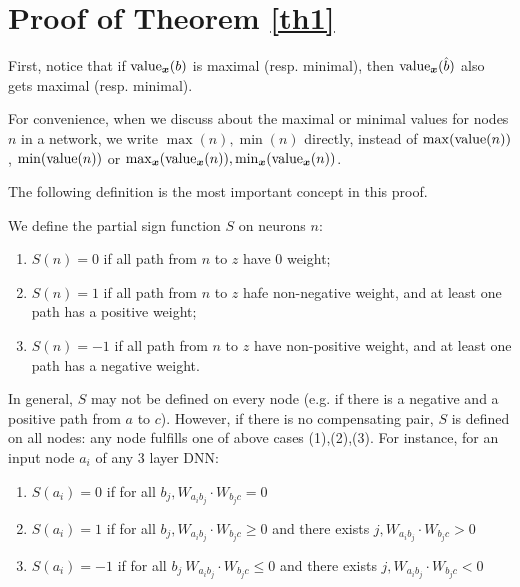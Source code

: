 	\section{Proof of Theorem \ref{th1}}	
	
	First, notice that if ${\textrm{value}}_{\boldsymbol{x}}(b)$ is maximal (resp. minimal), 
	then ${\textrm{value}}_{\boldsymbol{x}}(\hat{b})$ also gets maximal (resp. minimal). 
	
	For convenience, when we discuss about the maximal or minimal values for nodes $n$ in a network, we write $\max(n),\min(n)$ directly, instead of $\max({\textrm{value}}(n))$, $\min({\textrm{value}}(n))$ or $\max_{\boldsymbol{x}}({\textrm{value}}_{\boldsymbol{x}}(n)),\min_{\boldsymbol{x}}({\textrm{value}}_{\boldsymbol{x}}(n))$.
	
	
	The following definition is the most important concept in this proof.
	
	\begin{definition}\label{sign_of_nodes}
		We define the partial sign function $S$ on neurons $n$: 	
		\begin{enumerate}
			 \item $S(n)=0$ if all path from $n$ to $z$ have 0 weight; 
			 \item $S(n)=1$ if all path from $n$ to $z$ hafe non-negative weight, and at least one path has a positive weight; 
			 \item $S(n)=-1$ if all path from $n$ to $z$ have non-positive weight, and at least one path has a negative weight. 
		\end{enumerate}
	\end{definition}
	
	In general, $S$ may not be defined on every node (e.g. if there is a negative and a positive path from $a$ to $c$). However, if there is no compensating pair, $S$ is defined on all nodes: any node fulfills one of above cases (1),(2),(3).
		For instance, for an input node $a_i$ of any 3 layer DNN:
		\begin{enumerate}
			\item  $S(a_i)=0$ if 
			for all $b_j, W_{a_i b_j}\cdot W_{b_j c} = 0$
			
			
			\item  $S(a_i)=1$ if for all $b_j, W_{a_i b_j}\cdot W_{b_j c} \geq 0$ and there exists 
			$j, W_{a_i b_j}\cdot W_{b_j c} > 0$
			
			\item $S(a_i)=-1$ if for all $b_j\ W_{a_i b_j}\cdot W_{b_j c} \leq 0$ and there exists 
			$j, W_{a_i b_j}\cdot W_{b_j c} < 0$ 
		\end{enumerate}
		
